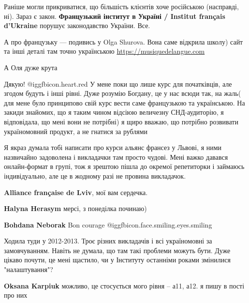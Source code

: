 \begin{itemize}

Раніше могли прикриватися, що більшість клієнтів хоче російською (насправді,
ні). Зараз є закон. \textbf{Французький інститут в Україні / Institut français
d'Ukraine} порушує законодавство України. Все.



А про французьку — подивись у Olga Shurova. Вона саме відкрила школу) сайт та
інші деталі там точно українською \url{https://musiquedelangue.com}

А Оля дуже крута

\begin{itemize} %
Дякую! @igg{fbicon.heart.red}
У мене поки що лише курс для початківців, але згодом будуть і інші рівні.
Дуже розумію Богдану, це у нас всюди так, на жаль( для мене було принципово свій курс вести саме французькою та українською. На закиди знайомих, що я таким чином відсіюю величезну СНД-аудиторію, я відповідала, що мені вони не потрібні) я щиро вважаю, що потрібно розвивати україномовний продукт, а не гнатися за рублями 
\end{itemize} %


Я якраз думала тобі написати про курси альянс франсез у Львові, я ними
назвичайно задоволена і викладачки там просто чудові. Мені важко давався
онлайн-формат в групі, тож я зрештою пішла до окремої репетиторки і займаюсь
індивідуально, але це в жодному разі не провина викладачок.

\textbf{Alliance française de Lviv}, мої вам сердечка.

\begin{itemize} %
\textbf{Halyna Herasym} мерсі, з понеділка починаю)

\textbf{Bohdana Neborak} Bon courage  @igg{fbicon.face.smiling.eyes.smiling} 
\end{itemize} %


Ходила туди у 2012-2013. Троє різних викладачів і всі україномовні за
замовчуванням. Навіть не думала, що там такі проблеми можуть бути. Дуже цікаво
почути, це мені щастило, чи у Інституту останніми роками змінилися
"налаштування"?

\begin{itemize} %
\textbf{Oksana Karpiuk} можливо, це стосується мого рівня – а11, а12. я пишу в пості про них


\end{itemize}
\end{itemize}
